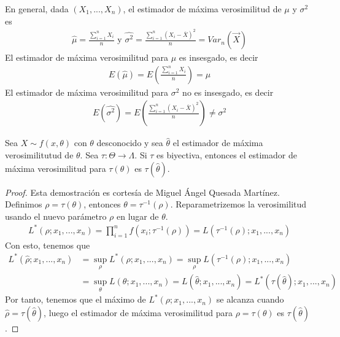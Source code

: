 \begin{obs}
En general, dada $(X_1,...,X_n)$, el estimador de máxima verosimilitud de $\mu$ y $\sigma^2$ es
\begin{align*}
    \hat{\mu} = \frac{\sum_{i=1}^{n}{X_i}}{n} \text{ \ \ \ y \ \ \ } \hat{\sigma^2} = \frac{\sum_{i=1}^{n}{(X_i -\overline{X})^2}}{n} = Var_n(\overrightarrow{X})
\end{align*}
El estimador de máxima verosimilitud para $\mu$ es insesgado, es decir
\begin{align*}
    E(\hat{\mu}) = E\left( \frac{\sum_{i=1}^{n}{X_i}}{n} \right) = \mu
\end{align*}
El estimador de máxima verosimilitud para $\sigma^2$ no es insesgado, es decir
\begin{align*}
    E(\hat{\sigma^2}) = E\left( \frac{\sum_{i=1}^{n}{(X_i -\overline{X})^2}}{n} \right)  \not = \sigma^2
\end{align*}
\end{obs}

\begin{teo}
Sea $X \sim f(x,\theta)$ con $\theta$ desconocido y sea $\hat{\theta}$ el estimador de máxima verosimilitutud de $\theta$. Sea $\tau : \Theta \longrightarrow \Lambda$. Si $\tau$ es biyectiva, entonces el estimador de máxima verosimilitud para $\tau(\theta)$ es $\tau(\hat{\theta})$.
\end{teo}

\begin{proof}
Esta demostración es cortesía de Miguel Ángel Quesada Martínez.
\\
\newline
Definimos $\rho = \tau(\theta)$, entonces $\theta = \tau^{-1}(\rho)$. Reparametrizemos la verosimilitud usando el nuevo parámetro $\rho$ en lugar de $\theta$.
\begin{align*}
    L^*(\rho;x_1,...,x_n) = \prod_{i=1}^{n}{f(x_i;\tau^{-1}(\rho))} = L(\tau^{-1}(\rho);x_1,...,x_n)
\end{align*}
Con esto, tenemos que
\begin{align*}
    L^*(\hat{\rho};x_1,...,x_n) &= \sup_{\rho} L^*(\rho;x_1,...,x_n) = \sup_{\rho} L(\tau^{-1}(\rho);x_1,...,x_n) \\
    &= \sup_{\theta} L(\theta;x_1,...,x_n) = L(\hat{\theta};x_1,...,x_n) = L^*(\tau(\hat{\theta});x_1,...,x_n)
\end{align*}
Por tanto, tenemos que el máximo de $L^*(\rho;x_1,...,x_n)$ se alcanza cuando $\hat{\rho} = \tau(\hat{\theta})$, luego el estimador de máxima verosimilitud para $\rho = \tau(\theta)$ es $\tau(\hat{\theta})$.
\end{proof}

